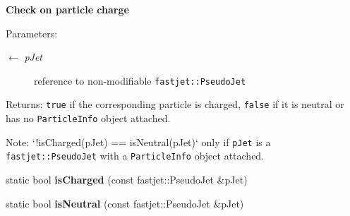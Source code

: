 \begin{Indent}{\bf Check on particle charge}\par
{\em \begin{Desc}
\item[Parameters:]
\begin{description}
\item[\mbox{$\leftarrow$} {\em p\-Jet}]reference to non-modifiable {\tt fastjet::Pseudo\-Jet} \end{description}
\end{Desc}
\begin{Desc}
\item[Returns:]{\tt true} if the corresponding particle is charged, {\tt false} if it is neutral or has no {\tt Particle\-Info} object attached.\end{Desc}
\begin{Desc}
\item[Note:]`!is\-Charged(p\-Jet) == is\-Neutral(p\-Jet)` only if {\tt p\-Jet} is a {\tt fastjet::Pseudo\-Jet} with a {\tt Particle\-Info} object attached. \end{Desc}
}\begin{CompactItemize}
\item 
\hypertarget{structFeatures_824b2ec4d467709843f066eaf619f15b}{
static bool \textbf{is\-Charged} (const fastjet::Pseudo\-Jet \&p\-Jet)}
\label{structFeatures_824b2ec4d467709843f066eaf619f15b}

\item 
\hypertarget{structFeatures_57dabc7c719c8b67ea982063b571debd}{
static bool \textbf{is\-Neutral} (const fastjet::Pseudo\-Jet \&p\-Jet)}
\label{structFeatures_57dabc7c719c8b67ea982063b571debd}

\end{CompactItemize}
\end{Indent}
